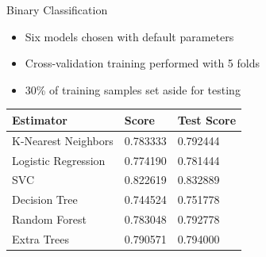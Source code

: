 \documentclass[aspectratio=169,handout]{beamer}
\begin{document}
\begin{frame}{Binary Classification}

  \begin{itemize}
  \item Six models chosen with default parameters
  \item Cross-validation  training performed with 5 folds
  \item 30\% of training samples set aside for testing
  \end{itemize}


  \begin{center}
    \begin{tabular}{|l|l|l|}
      \hline
      Estimator & Score & Test Score \\
      \hline
      K-Nearest Neighbors & 0.783333 & 0.792444 \\
      Logistic Regression & 0.774190 & 0.781444 \\
      SVC & 0.822619 & 0.832889 \\
      Decision Tree & 0.744524 & 0.751778 \\
      Random Forest & 0.783048 & 0.792778 \\
      Extra Trees & 0.790571 & 0.794000 \\
      \hline
    \end{tabular}
  \end{center}


\end{frame}
\end{document}
